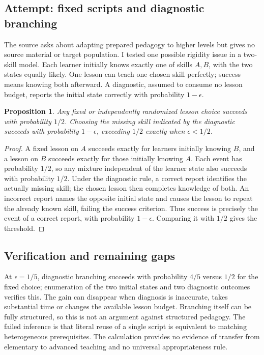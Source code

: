 \documentclass[11pt]{article}
\newtheorem{proposition}{Proposition}
\begin{document}
\subsection{Attempt: fixed scripts and diagnostic branching}
The source asks about adapting prepared pedagogy to higher levels but gives no source material or target population. I tested one possible rigidity issue in a two-skill model. Each learner initially knows exactly one of skills $A,B$, with the two states equally likely. One lesson can teach one chosen skill perfectly; success means knowing both afterward. A diagnostic, assumed to consume no lesson budget, reports the initial state correctly with probability $1-\epsilon$.
\begin{proposition}
Any fixed or independently randomized lesson choice succeeds with probability $1/2$. Choosing the missing skill indicated by the diagnostic succeeds with probability $1-\epsilon$, exceeding $1/2$ exactly when $\epsilon<1/2$.
\end{proposition}
\begin{proof}
A fixed lesson on $A$ succeeds exactly for learners initially knowing $B$, and a lesson on $B$ succeeds exactly for those initially knowing $A$. Each event has probability $1/2$, so any mixture independent of the learner state also succeeds with probability $1/2$. Under the diagnostic rule, a correct report identifies the actually missing skill; the chosen lesson then completes knowledge of both. An incorrect report names the opposite initial state and causes the lesson to repeat the already known skill, failing the success criterion. Thus success is precisely the event of a correct report, with probability $1-\epsilon$. Comparing it with $1/2$ gives the threshold.
\end{proof}
\subsection{Verification and remaining gaps}
At $\epsilon=1/5$, diagnostic branching succeeds with probability $4/5$ versus $1/2$ for the fixed choice; enumeration of the two initial states and two diagnostic outcomes verifies this. The gain can disappear when diagnosis is inaccurate, takes substantial time or changes the available lesson budget. Branching itself can be fully structured, so this is not an argument against structured pedagogy. The failed inference is that literal reuse of a single script is equivalent to matching heterogeneous prerequisites. The calculation provides no evidence of transfer from elementary to advanced teaching and no universal appropriateness rule.
\end{document}
